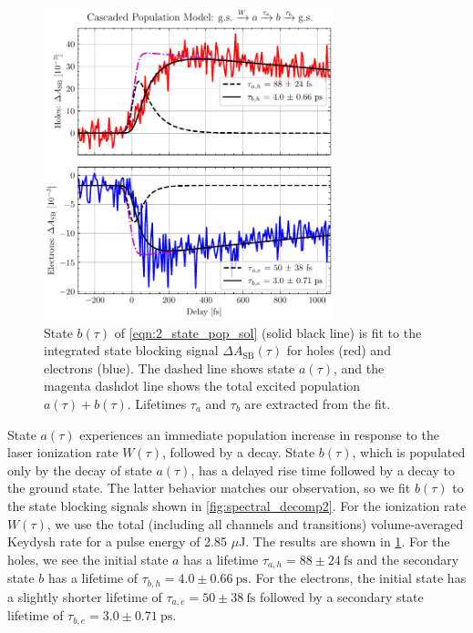 \begin{figure}
	\centering
	\includegraphics[width=0.75\textwidth]{figures/chap4/SB_eh_2state_model.pdf}
	\caption{State $b(\tau)$ of \cref{eqn:2_state_pop_sol} (solid black line) is fit to the integrated state blocking signal $\Delta A_{\textrm{SB}}(\tau)$ for holes (red) and electrons (blue). The dashed line shows state $a(\tau)$, and the magenta dashdot line shows the total excited population $a(\tau)+b(\tau)$. Lifetimes $\tau_a$ and $\tau_b$ are extracted from the fit.}
	\label{fig:SB_eh_2state_model}
\end{figure}


State $a(\tau)$ experiences an immediate population increase in response to the laser ionization rate $W(\tau)$, followed by a decay. State $b(\tau)$, which is populated only by the decay of state $a(\tau)$, has a delayed rise time followed by a decay to the ground state. The latter behavior matches our observation, so we fit $b(\tau)$ to the state blocking signals shown in \cref{fig:spectral_decomp2}. For the ionization rate $W(\tau)$, we use the total (including all channels and transitions) volume-averaged Keydysh rate for a pulse energy of 2.85 $\mu$J. The results are shown in \cref{fig:SB_eh_2state_model}. For the holes, we see the initial state $a$ has a lifetime $\tau_{a,h} = 88 \pm 24 \ \textrm{fs}$ and the secondary state $b$ has a lifetime of $\tau_{b,h} = 4.0 \pm 0.66 \ \textrm{ps}$. For the electrons, the initial state has a slightly shorter lifetime of ${\tau_{a,e} = 50 \pm 38 \ \textrm{fs}}$ followed by a secondary state lifetime of ${\tau_{b,e} = 3.0 \pm 0.71 \ \textrm{ps}}$.

